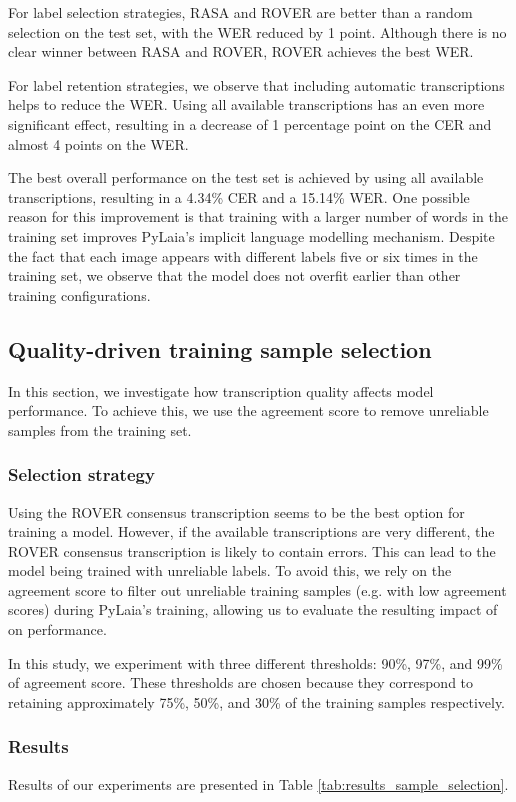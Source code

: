 \documentclass[sigconf]{acmart}
\begin{document}
For label selection strategies, RASA and ROVER are better than a random selection on the test set, with the WER reduced by 1 point. Although there is no clear winner between RASA and ROVER, ROVER achieves the best WER. 

For label retention strategies, we observe that including automatic transcriptions helps to reduce the WER. Using all available transcriptions has an even more significant effect, resulting in a decrease of 1 percentage point on the CER and almost 4 points on the WER.

The best overall performance on the test set is achieved by using all available transcriptions, resulting in a 4.34\% CER and a 15.14\% WER. One possible reason for this improvement is that training with a larger number of words in the training set improves PyLaia's implicit language modelling mechanism. 
Despite the fact that each image appears with different labels five or six times in the training set, we observe that the model does not overfit earlier than other training configurations.

\subsection{Quality-driven training sample selection}
In this section, we investigate how transcription quality affects model performance. To achieve this, we use the agreement score to remove unreliable samples from the training set.

\subsubsection{Selection strategy}
Using the ROVER consensus transcription seems to be the best option for training a model. However, if the available transcriptions are very different, the ROVER consensus transcription is likely to contain errors. This can lead to the model being trained with unreliable labels. 
To avoid this, we rely on the agreement score to filter out unreliable training samples (e.g. with low agreement scores) during PyLaia's training, allowing us to evaluate the resulting impact of on performance.

In this study, we experiment with three different thresholds: 90\%, 97\%, and 99\% of agreement score. These thresholds are chosen because they correspond to retaining approximately 75\%, 50\%, and 30\% of the training samples respectively.

\subsubsection{Results}
Results of our experiments are presented in Table \ref{tab:results_sample_selection}.
\end{document}

